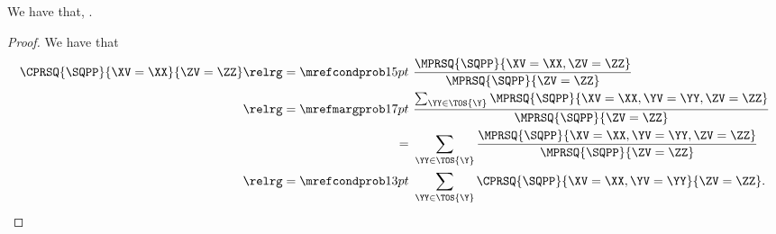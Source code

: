 \begin{proposition}
  We have that, \sqcpmprobgexprprop.%
\end{proposition}

\begin{proof}
  We have that
  \begin{align*}
    \CPRSQ{\SQPP}{\XV = \XX}{\ZV = \ZZ} 
    \relrg = {\mrefcondprob} 15pt \ &
    \frac
    {\MPRSQ{\SQPP}{\XV = \XX,\ZV = \ZZ}}
    {\MPRSQ{\SQPP}{\ZV = \ZZ}}\\
    \relrg = {\mrefmargprob} 17pt \ &
    \frac
    {\sum_{\YY \in \TOS{\Y}}\MPRSQ{\SQPP}{\XV = \XX, \YV = \YY,\ZV = \ZZ}}
    {\MPRSQ{\SQPP}{\ZV = \ZZ}}\\
    =\ & 
    \sum_{\YY \in \TOS{\Y}}
    \frac
    {\MPRSQ{\SQPP}{\XV = \XX, \YV = \YY,\ZV = \ZZ}}
    {\MPRSQ{\SQPP}{\ZV = \ZZ}}\\
    \relrg = {\mrefcondprob} 13pt \ &
    \sum_{\YY \in \TOS{\Y}}\CPRSQ{\SQPP}{\XV = \XX, \YV = \YY}{\ZV = \ZZ}.
  \end{align*}
\end{proof}
